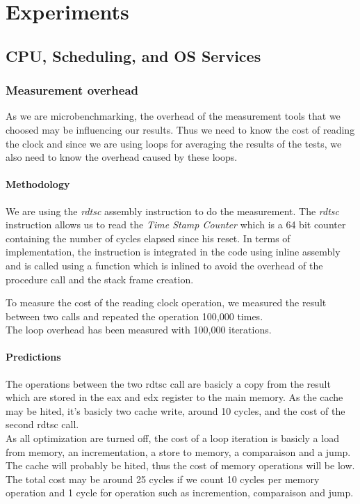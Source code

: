\section{Experiments}

\subsection{CPU, Scheduling, and OS Services}

\subsubsection{Measurement overhead}

As we are microbenchmarking, the overhead of the measurement tools that we
choosed may be influencing our results. Thus we need to know the cost of reading
the clock and since we are using loops for averaging the results of the tests, we
also need to know the overhead caused by these loops.

\paragraph{Methodology}
We are using the \emph{rdtsc} assembly instruction to do the measurement.
The \emph{rdtsc} instruction allows us to read the \emph{Time Stamp Counter}
which is a 64 bit counter containing the number of cycles elapsed since his
reset.
In terms of implementation, the instruction is integrated in the code using
inline assembly and is called using a function which is inlined to avoid the
overhead of the procedure call and the stack frame creation.

To measure the cost of the reading clock operation, we measured the result between
two calls and repeated the operation 100,000 times.\\

The loop overhead has been measured with 100,000 iterations.

\paragraph{Predictions}
The operations between the two rdtsc call are basicly a copy from the result
which are stored in the eax and edx register to the main memory.
As the cache may be hited, it's basicly two cache write, around 10 cycles, and
the cost of the second rdtsc call.\\

As all optimization are turned off, the cost of a loop iteration is basicly a
load from memory, an incrementation, a store to memory, a comparaison and a
jump.
The cache will probably be hited, thus the cost of memory operations will be low.
The total cost may be around 25 cycles if we count 10 cycles per memory
operation and 1 cycle for operation such as incremention, comparaison and
jump.\\

